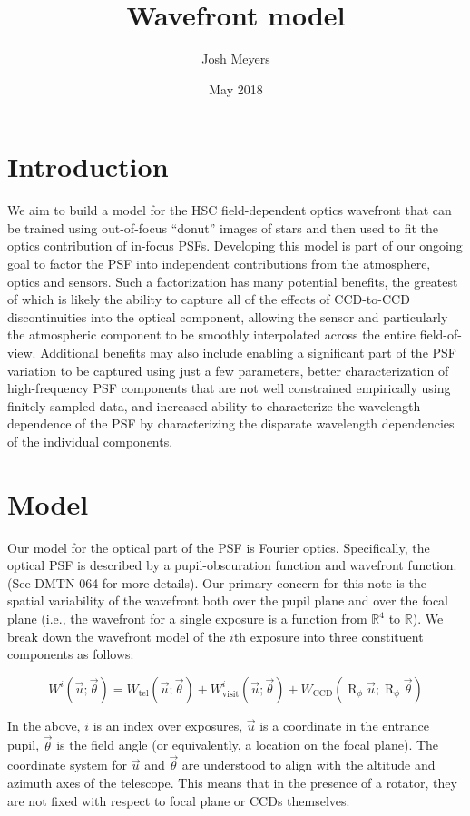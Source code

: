 \documentclass{article}
\title{Wavefront model}
\author{Josh Meyers}
\date{May 2018}
\DeclareMathOperator{\R}{R}
\begin{document}
\section{Introduction}

We aim to build a model for the HSC field-dependent optics wavefront that can be
trained using out-of-focus ``donut'' images of stars and then used to fit the
optics contribution of in-focus PSFs.  Developing this model is part of our
ongoing goal to factor the PSF into independent contributions from the
atmosphere, optics and sensors.  Such a factorization has many potential
benefits, the greatest of which is likely the ability to capture all of the
effects of CCD-to-CCD discontinuities into the optical component, allowing the
sensor  and particularly the atmospheric component to be smoothly interpolated
across the entire field-of-view.  Additional benefits may also include enabling
a significant part of the PSF variation to be captured using just a few
parameters, better characterization of high-frequency PSF components that are
not well constrained empirically using finitely sampled data, and increased
ability to characterize the wavelength dependence of the PSF by characterizing
the disparate wavelength dependencies of the individual components.

\section{Model}

Our model for the optical part of the PSF is Fourier optics.  Specifically, the
optical PSF is described by a pupil-obscuration function and wavefront function.
(See DMTN-064 for more details).  Our primary concern for this note is the
spatial variability of the wavefront both over the pupil plane and over the
focal plane (i.e., the wavefront for a single exposure is a function from
$\mathbb{R}^4$ to $\mathbb{R}$).  We break down the wavefront model of the $i$th
exposure into three constituent components as follows:

\begin{equation}
    W^i\left(\vec{u}; \vec{\theta}\right) =
    W_\mathrm{tel}\left(\vec{u}; \vec{\theta}\right) +
    W_\mathrm{visit}^i\left(\vec{u}; \vec{\theta}\right) +
    W_\mathrm{CCD}\left(\R_\phi \vec{u}; \R_\phi \vec{\theta}\right)
\end{equation}

In the above, $i$ is an index over exposures, $\vec{u}$ is a coordinate in the
entrance pupil, $\vec{\theta}$ is the field angle (or equivalently, a location
on the focal plane).  The coordinate system for $\vec{u}$ and $\vec{\theta}$ are
understood to align with the altitude and azimuth axes of the telescope.
This means that in the presence of a rotator, they are not fixed with respect to
focal plane or CCDs themselves.
\end{document}

